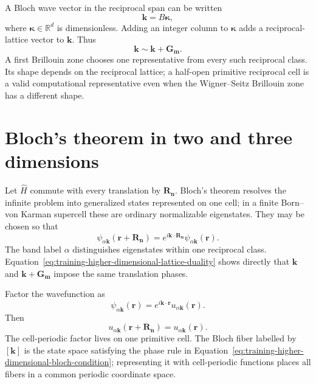 A Bloch wave vector in the reciprocal span can be written
\begin{equation}
  \mathbf k=B\boldsymbol\kappa,
  \label{eq:training-higher-dimensional-reduced-wave-vector}
\end{equation}
where $\boldsymbol\kappa\in\mathbb R^d$ is dimensionless. Adding an integer
column to $\boldsymbol\kappa$ adds a reciprocal-lattice vector to
$\mathbf k$. Thus
\begin{equation}
  \mathbf k\sim\mathbf k+\mathbf G_{\mathbf m}.
  \label{eq:training-higher-dimensional-reciprocal-equivalence}
\end{equation}
A first Brillouin zone chooses one representative from every such reciprocal
class. Its shape depends on the reciprocal lattice; a half-open primitive
reciprocal cell is a valid computational representative even when the
Wigner--Seitz Brillouin zone has a different shape.

\section{Bloch's theorem in two and three dimensions}

Let $\widehat H$ commute with every translation by
$\mathbf R_{\mathbf n}$. Bloch's theorem resolves the infinite problem into
generalized states represented on one cell; in a finite Born--von Karman
supercell these are ordinary normalizable eigenstates. They may be chosen so
that
\begin{equation}
  \psi_{\alpha\mathbf k}
  (\mathbf r+\mathbf R_{\mathbf n})
  =e^{i\mathbf k\cdot\mathbf R_{\mathbf n}}
   \psi_{\alpha\mathbf k}(\mathbf r).
  \label{eq:training-higher-dimensional-bloch-condition}
\end{equation}
The band label $\alpha$ distinguishes eigenstates within one reciprocal class.
Equation~\eqref{eq:training-higher-dimensional-lattice-duality} shows directly
that $\mathbf k$ and $\mathbf k+\mathbf G_{\mathbf m}$ impose the same
translation phases.

Factor the wavefunction as
\begin{equation}
  \psi_{\alpha\mathbf k}(\mathbf r)
  =e^{i\mathbf k\cdot\mathbf r}
   u_{\alpha\mathbf k}(\mathbf r).
  \label{eq:training-higher-dimensional-bloch-factorization}
\end{equation}
Then
\begin{equation}
  u_{\alpha\mathbf k}
  (\mathbf r+\mathbf R_{\mathbf n})
  =u_{\alpha\mathbf k}(\mathbf r).
\end{equation}
The cell-periodic factor lives on one primitive cell. The Bloch fiber labelled
by $[\mathbf k]$ is the state space satisfying the phase rule in
Equation~\eqref{eq:training-higher-dimensional-bloch-condition}; representing
it with cell-periodic functions places all fibers in a common periodic
coordinate space.

